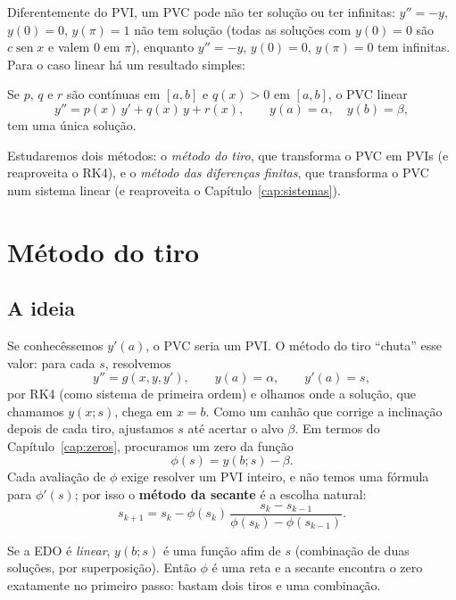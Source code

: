 Diferentemente do PVI, um PVC pode não ter solução ou ter infinitas: $y''=-y$,
$y(0)=0$, $y(\pi)=1$ não tem solução (todas as soluções com $y(0)=0$ são $c\operatorname{sen}x$
e valem 0 em $\pi$), enquanto $y''=-y$, $y(0)=0$, $y(\pi)=0$ tem infinitas. Para o caso
linear há um resultado simples:

\begin{teorema}\label{teo:pvclinear}
Se $p$, $q$ e $r$ são contínuas em $[a,b]$ e $q(x)>0$ em $[a,b]$, o PVC linear
\[
y''=p(x)\,y'+q(x)\,y+r(x),\qquad y(a)=\alpha,\quad y(b)=\beta,
\]
tem uma única solução.
\end{teorema}

Estudaremos dois métodos: o \emph{método do tiro}, que transforma o PVC em PVIs (e reaproveita
o RK4), e o \emph{método das diferenças finitas}, que transforma o PVC num sistema linear (e
reaproveita o Capítulo~\ref{cap:sistemas}).

\section{Método do tiro}

\subsection{A ideia}

Se conhecêssemos $y'(a)$, o PVC seria um PVI. O método do tiro ``chuta'' esse valor:
para cada $s$, resolvemos
\[
y''=g(x,y,y'),\qquad y(a)=\alpha,\qquad y'(a)=s,
\]
por RK4 (como sistema de primeira ordem) e olhamos onde a solução, que chamamos $y(x;s)$,
chega em $x=b$. Como um canhão que corrige a inclinação depois de cada tiro, ajustamos $s$
até acertar o alvo $\beta$. Em termos do Capítulo~\ref{cap:zeros}, procuramos um zero da função
\[
\phi(s)=y(b;s)-\beta.
\]
Cada avaliação de $\phi$ exige resolver um PVI inteiro, e não temos uma fórmula para
$\phi'(s)$; por isso o \textbf{método da secante} é a escolha natural:
\[
s_{k+1}=s_k-\phi(s_k)\,\frac{s_k-s_{k-1}}{\phi(s_k)-\phi(s_{k-1})}.
\]

\begin{observacao}
Se a EDO é \emph{linear}, $y(b;s)$ é uma função afim de $s$ (combinação de duas soluções, por
superposição). Então $\phi$ é uma reta e a secante encontra o zero exatamente no primeiro
passo: bastam dois tiros e uma combinação.
\end{observacao}

